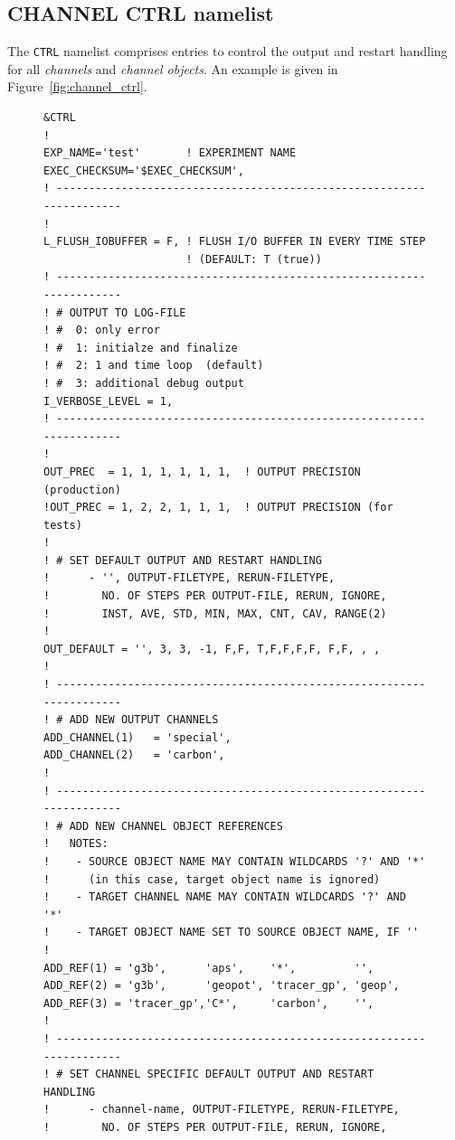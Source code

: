 \documentclass[twoside]{article}
\begin{document}
{\subsection{CHANNEL CTRL namelist}
\label{sec:channelCTRL}
The {\tt CTRL} namelist comprises entries to control the output and restart
handling for all {\it channels} and {\it channel objects}.
An example is given in Figure~\ref{fig:channel_ctrl}.
%
\begin{figure}[h!]
\begin{center}
\begin{minipage}{0.6\textwidth}
\footnotesize
\begin{verbatim}
&CTRL
!
EXP_NAME='test'       ! EXPERIMENT NAME
EXEC_CHECKSUM='$EXEC_CHECKSUM',
! ---------------------------------------------------------------------
!
L_FLUSH_IOBUFFER = F, ! FLUSH I/O BUFFER IN EVERY TIME STEP
                      ! (DEFAULT: T (true))
! ---------------------------------------------------------------------
! # OUTPUT TO LOG-FILE
! #  0: only error
! #  1: initialze and finalize
! #  2: 1 and time loop  (default)
! #  3: additional debug output
I_VERBOSE_LEVEL = 1,
! ---------------------------------------------------------------------
!
OUT_PREC  = 1, 1, 1, 1, 1, 1,  ! OUTPUT PRECISION (production)
!OUT_PREC = 1, 2, 2, 1, 1, 1,  ! OUTPUT PRECISION (for tests)
!
! # SET DEFAULT OUTPUT AND RESTART HANDLING
!      - '', OUTPUT-FILETYPE, RERUN-FILETYPE,
!        NO. OF STEPS PER OUTPUT-FILE, RERUN, IGNORE,
!        INST, AVE, STD, MIN, MAX, CNT, CAV, RANGE(2)
!
OUT_DEFAULT = '', 3, 3, -1, F,F, T,F,F,F,F, F,F, , ,
!
! ---------------------------------------------------------------------
! # ADD NEW OUTPUT CHANNELS
ADD_CHANNEL(1)   = 'special',
ADD_CHANNEL(2)   = 'carbon',
!
! ---------------------------------------------------------------------
! # ADD NEW CHANNEL OBJECT REFERENCES
!   NOTES:
!    - SOURCE OBJECT NAME MAY CONTAIN WILDCARDS '?' AND '*'
!      (in this case, target object name is ignored)
!    - TARGET CHANNEL NAME MAY CONTAIN WILDCARDS '?' AND '*'
!    - TARGET OBJECT NAME SET TO SOURCE OBJECT NAME, IF ''
!
ADD_REF(1) = 'g3b',      'aps',    '*',         '',
ADD_REF(2) = 'g3b',      'geopot', 'tracer_gp', 'geop',
ADD_REF(3) = 'tracer_gp','C*',     'carbon',    '',
!
! ---------------------------------------------------------------------
! # SET CHANNEL SPECIFIC DEFAULT OUTPUT AND RESTART HANDLING
!      - channel-name, OUTPUT-FILETYPE, RERUN-FILETYPE,
!        NO. OF STEPS PER OUTPUT-FILE, RERUN, IGNORE,

\end{verbatim}
\end{minipage}
\end{center}
\end{figure}}
\end{document}
